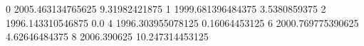 0 2005.463134765625 9.31982421875
1 1999.681396484375 3.5380859375
2 1996.143310546875 0.0
4 1996.303955078125 0.16064453125
6 2000.769775390625 4.62646484375
8 2006.390625 10.247314453125

